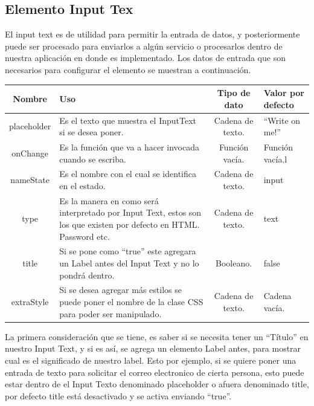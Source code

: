 \newline
\newline



\subsection{Elemento Input Tex}
El input text es de utilidad para permitir la entrada de datos, y posteriormente puede ser procesado para enviarlos a algún servicio o procesarlos dentro de nuestra aplicación en donde es implementado.
Los datos de entrada que son necesarios para configurar el elemento se muestran a continuación.
\newline
\newline
\begin{center}
 \begin{tabular}{ | c |  p{5cm}  | c | p{3cm} |} 
 \hline
 \textbf{Nombre} &  \textbf{Uso} &  \textbf{ Tipo de dato} &  \textbf{Valor por defecto}\\ [0.5ex] 
 \hline\hline
placeholder &Es el texto que muestra el InputText si se desea poner.  &  Cadena de texto. 	& “Write on me!” \\  [2.5ex] 
 \hline
onChange & Es la función que va a hacer invocada cuando se escriba.     & Función vacía.  	& Función vacía.l \\[2.5ex] 
 \hline
nameState & Es el nombre con el cual se identifica en el estado.    & Cadena de texto.	& input \\[3.5ex] 
 \hline
 type   & Es la manera en como será interpretado por Input Text, estos son los que existen por defecto en HTML. Password etc.&  Cadena de texto.	& text \\[2.5ex] 
 \hline
 title  & Si se pone como “true” este agregara un Label antes del Input Text y no lo pondrá dentro.&  Booleano.	& false \\[2.5ex] 
 \hline
 extraStyle   & Si se desea agregar más estilos se puede poner el nombre de la clase CSS para poder ser manipulado.&  Cadena de texto. 	& Cadena vacía. \\[2.5ex] 
 \hline
\end{tabular}
\end{center}
\newline
\newline
La primera consideración que se tiene, es saber si se necesita tener un “Título” en nuestro Input Text, y si es así, se agrega un elemento Label antes,  para mostrar cual es el significado de nuestro label. Esto por ejemplo, si se quiere poner una entrada de texto para solicitar el correo electronico de cierta persona, esto puede estar dentro de el Input Texto denominado placeholder o afuera denominado title, por defecto title está desactivado y se activa enviando “true”.
